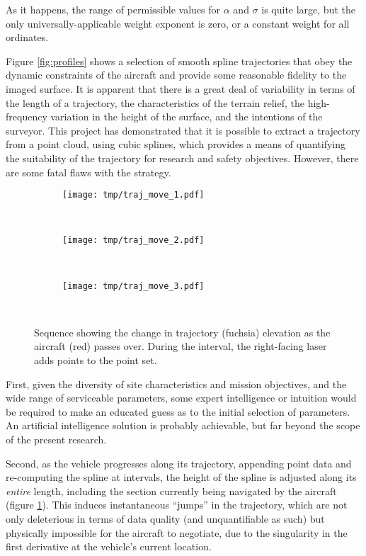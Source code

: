 \documentclass[doc]{apa6}
\begin{document}
As it happens, the range of permissible values for $\alpha$ and $\sigma$ is quite large, but the only universally-applicable weight exponent is zero, or a constant weight for all ordinates.

Figure \ref{fig:profiles} shows a selection of smooth spline trajectories that obey the dynamic constraints of the aircraft and provide some reasonable fidelity to the imaged surface. It is apparent that there is a great deal of variability in terms of the length of a trajectory, the characteristics of the terrain relief, the high-frequency variation in the height of the surface, and the intentions of the surveyor. This project has demonstrated that it is possible to extract a trajectory from a point cloud, using cubic splines, which provides a means of quantifying the suitability of the trajectory for research and safety objectives. However, there are some fatal flaws with the strategy. 

\begin{figure} %
\begin{center}
\begin{subfigure}[b]{0.3\textwidth}
\texttt{[image: tmp/traj\_move\_1.pdf]} 
\end{subfigure}
~
\begin{subfigure}[b]{0.3\textwidth}
\texttt{[image: tmp/traj\_move\_2.pdf]} 
\end{subfigure}
~
\begin{subfigure}[b]{0.3\textwidth}
\texttt{[image: tmp/traj\_move\_3.pdf]} 
\end{subfigure}
\end{center}
~
\caption{Sequence showing the change in trajectory (fuchsia) elevation as the aircraft  (red) passes over. During the interval, the right-facing laser adds points to the point set.}
\label{fig:traj_move}
\end{figure}

First, given the diversity of site characteristics and mission objectives, and the wide range of serviceable parameters, some expert intelligence or intuition would be required to make an educated guess as to the initial selection of parameters. An artificial intelligence solution is probably achievable, but far beyond the scope of the present research.

Second, as the vehicle progresses along its trajectory, appending point data and re-computing the spline at intervals, the height of the spline is adjusted along its \emph{entire} length, including the section currently being navigated by the aircraft (figure \ref{fig:traj_move}). This induces instantaneous ``jumps'' in the trajectory, which are not only deleterious in terms of data quality (and unquantifiable as such) but physically impossible for the aircraft to negotiate, due to the singularity in the first derivative at the vehicle's current location.
\end{document}
